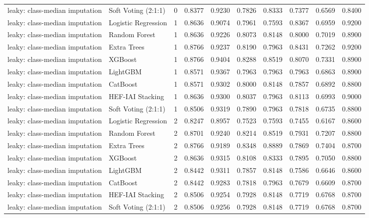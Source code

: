 \begin{tabular}{llrrrrrrrr}
leaky: class-median imputation & Soft Voting (2:1:1) & 0 & 0.8377 & 0.9230 & 0.7826 & 0.8333 & 0.7377 & 0.6569 & 0.8400 \\
leaky: class-median imputation & Logistic Regression & 1 & 0.8636 & 0.9074 & 0.7961 & 0.7593 & 0.8367 & 0.6959 & 0.9200 \\
leaky: class-median imputation & Random Forest & 1 & 0.8636 & 0.9226 & 0.8073 & 0.8148 & 0.8000 & 0.7019 & 0.8900 \\
leaky: class-median imputation & Extra Trees & 1 & 0.8766 & 0.9237 & 0.8190 & 0.7963 & 0.8431 & 0.7262 & 0.9200 \\
leaky: class-median imputation & XGBoost & 1 & 0.8766 & 0.9404 & 0.8288 & 0.8519 & 0.8070 & 0.7331 & 0.8900 \\
leaky: class-median imputation & LightGBM & 1 & 0.8571 & 0.9367 & 0.7963 & 0.7963 & 0.7963 & 0.6863 & 0.8900 \\
leaky: class-median imputation & CatBoost & 1 & 0.8571 & 0.9302 & 0.8000 & 0.8148 & 0.7857 & 0.6892 & 0.8800 \\
leaky: class-median imputation & HEF-IAI Stacking & 1 & 0.8636 & 0.9300 & 0.8037 & 0.7963 & 0.8113 & 0.6993 & 0.9000 \\
leaky: class-median imputation & Soft Voting (2:1:1) & 1 & 0.8506 & 0.9319 & 0.7890 & 0.7963 & 0.7818 & 0.6735 & 0.8800 \\
leaky: class-median imputation & Logistic Regression & 2 & 0.8247 & 0.8957 & 0.7523 & 0.7593 & 0.7455 & 0.6167 & 0.8600 \\
leaky: class-median imputation & Random Forest & 2 & 0.8701 & 0.9240 & 0.8214 & 0.8519 & 0.7931 & 0.7207 & 0.8800 \\
leaky: class-median imputation & Extra Trees & 2 & 0.8766 & 0.9189 & 0.8348 & 0.8889 & 0.7869 & 0.7404 & 0.8700 \\
leaky: class-median imputation & XGBoost & 2 & 0.8636 & 0.9315 & 0.8108 & 0.8333 & 0.7895 & 0.7050 & 0.8800 \\
leaky: class-median imputation & LightGBM & 2 & 0.8442 & 0.9311 & 0.7857 & 0.8148 & 0.7586 & 0.6646 & 0.8600 \\
leaky: class-median imputation & CatBoost & 2 & 0.8442 & 0.9283 & 0.7818 & 0.7963 & 0.7679 & 0.6609 & 0.8700 \\
leaky: class-median imputation & HEF-IAI Stacking & 2 & 0.8506 & 0.9254 & 0.7928 & 0.8148 & 0.7719 & 0.6768 & 0.8700 \\
leaky: class-median imputation & Soft Voting (2:1:1) & 2 & 0.8506 & 0.9256 & 0.7928 & 0.8148 & 0.7719 & 0.6768 & 0.8700 \\

\end{tabular}
